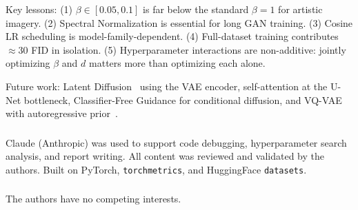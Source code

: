 \documentclass[runningheads]{llncs}
\begin{document}
Key lessons: (1) $\beta \in [0.05, 0.1]$ is far below the standard $\beta=1$ for artistic imagery. (2) Spectral Normalization is essential for long GAN training. (3) Cosine LR scheduling is model-family-dependent. (4) Full-dataset training contributes $\approx$30 FID in isolation. (5) Hyperparameter interactions are non-additive: jointly optimizing $\beta$ and $d$ matters more than optimizing each alone.

Future work: Latent Diffusion~\cite{rombach2022} using the VAE encoder, self-attention at the U-Net bottleneck, Classifier-Free Guidance for conditional diffusion, and VQ-VAE with autoregressive prior~\cite{oord2017}.

\begin{credits}
\subsubsection{\ackname}
Claude (Anthropic) was used to support code debugging, hyperparameter search analysis, and report writing. All content was reviewed and validated by the authors. Built on PyTorch, \texttt{torchmetrics}, and HuggingFace \texttt{datasets}.

\subsubsection{\discintname}
The authors have no competing interests.
\end{credits}
\end{document}
